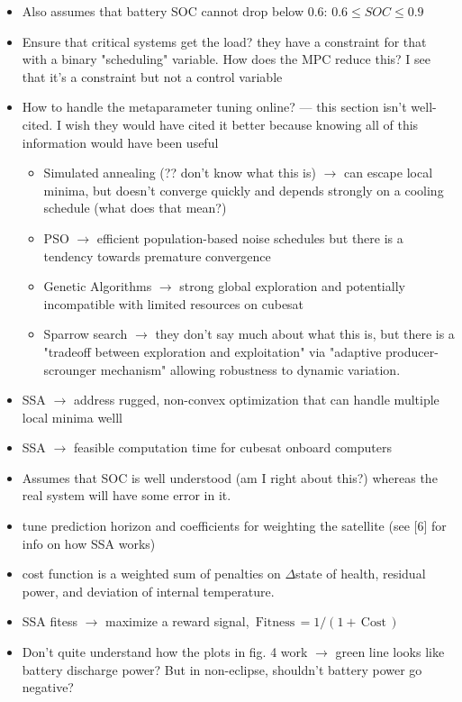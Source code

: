 \documentclass[11pt]{article}
\begin{document}
\begin{itemize}[noitemsep]
    \item Also assumes that battery SOC cannot drop below 0.6: $0.6 \leq SOC \leq 0.9$
    \item Ensure that critical systems get the load? they have a constraint for that with a binary "scheduling" variable. How does the MPC reduce this? I see that it's a constraint but not a control variable
    \item How to handle the metaparameter tuning online? --- this section isn't well-cited. I wish they would have cited it better because knowing all of this information would have been useful
    \begin{itemize}[noitemsep]
        \item Simulated annealing (?? don't know what this is) $\rightarrow$ can escape local minima, but doesn't converge quickly and depends strongly on a cooling schedule (what does that mean?)
        \item PSO $\rightarrow$ efficient population-based noise schedules but there is a tendency towards premature convergence
        \item Genetic Algorithms $\rightarrow$ strong global exploration and potentially incompatible with limited resources on cubesat
        \item Sparrow search $\rightarrow$ they don't say much about what this is, but there is a "tradeoff between exploration and exploitation" via "adaptive producer-scrounger mechanism" allowing robustness to dynamic variation.
    \end{itemize}
    \item SSA $\rightarrow$ address rugged, non-convex optimization that can handle multiple local minima welll
    \item SSA $\rightarrow$ feasible computation time for cubesat onboard computers
    \item Assumes that SOC is well understood (am I right about this?) whereas the real system will have some error in it.
    \item tune prediction horizon and coefficients for weighting the satellite (see [6] for info on how SSA works)
    \item cost function is a weighted sum of penalties on $\Delta$state of health, residual power, and deviation of internal temperature. 
    \item SSA fitess $\rightarrow$ maximize a reward signal, $\,\text{Fitness}\, = 1 / (1 + \,\text{Cost}\,)$
    \item Don't quite understand how the plots in fig. 4 work $\rightarrow$ green line looks like battery discharge power? But in non-eclipse, shouldn't battery power go negative? 

\end{itemize}
\end{document}
